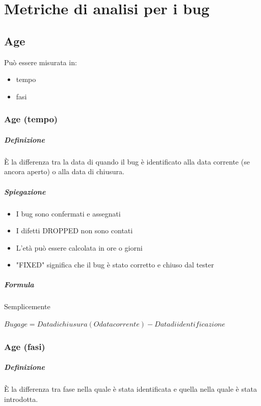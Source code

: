 \documentclass[11pt,a4paper]{book}
\begin{document}
\chapter{Metriche di analisi per i bug}
\section{Age}
Può essere misurata in:
\begin{itemize}
	\item tempo
	\item fasi
\end{itemize}

\subsection{Age (tempo)}
\paragraph{Definizione}
È la differenza tra la data di quando il bug è identificato alla data corrente (se ancora aperto) o alla data di chiusura.

\paragraph{Spiegazione}
\begin{itemize}
	\item I bug sono confermati e assegnati
	\item I difetti DROPPED non sono contati
	\item L'età può essere calcolata in ore o giorni
	\item "FIXED" significa che il bug è stato corretto e chiuso dal tester
\end{itemize}

\paragraph{Formula}
Semplicemente
\begin{center}
	$Bug age = Data di chiusura (O data corrente) - Data di identificazione$
\end{center}

\subsection{Age (fasi)}
\paragraph{Definizione}
È la differenza tra fase nella quale è stata identificata e quella nella quale è stata introdotta.
\end{document}
